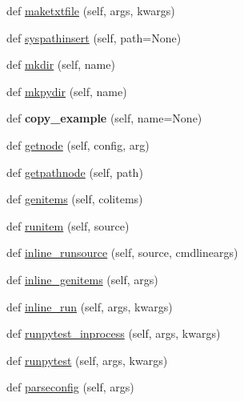\begin{DoxyCompactItemize}
\item 
def \hyperlink{class__pytest_1_1pytester_1_1_testdir_af243dc840be0d233114a96752547a33b}{maketxtfile} (self, args, kwargs)
\item 
def \hyperlink{class__pytest_1_1pytester_1_1_testdir_a9437e10415a1ca4b4fe29673915068bf}{syspathinsert} (self, path=None)
\item 
def \hyperlink{class__pytest_1_1pytester_1_1_testdir_a7d88a5789ed53d858fc1fe101a1be593}{mkdir} (self, name)
\item 
def \hyperlink{class__pytest_1_1pytester_1_1_testdir_ab2d4c79312104e21f88d2eb6230066b1}{mkpydir} (self, name)
\item 
\mbox{\label{class__pytest_1_1pytester_1_1_testdir_a9c9677a0d603a348e0b35bac29d9a255}} 
def {\bfseries copy\+\_\+example} (self, name=None)
\item 
def \hyperlink{class__pytest_1_1pytester_1_1_testdir_af9e60f840e1eeaa260f1fd64b636cbe7}{getnode} (self, config, arg)
\item 
def \hyperlink{class__pytest_1_1pytester_1_1_testdir_ac544eecddd1077f1de26cd535b1da6a9}{getpathnode} (self, path)
\item 
def \hyperlink{class__pytest_1_1pytester_1_1_testdir_af47df60840de34d96ad0b034011a68a8}{genitems} (self, colitems)
\item 
def \hyperlink{class__pytest_1_1pytester_1_1_testdir_a65252fa712e7952bb810a29fbbc6dc0f}{runitem} (self, source)
\item 
def \hyperlink{class__pytest_1_1pytester_1_1_testdir_a2ee5a96d0465218a7690d1b8de82b944}{inline\+\_\+runsource} (self, source, cmdlineargs)
\item 
def \hyperlink{class__pytest_1_1pytester_1_1_testdir_aafd63d830bf03e153edb68743b088bcb}{inline\+\_\+genitems} (self, args)
\item 
def \hyperlink{class__pytest_1_1pytester_1_1_testdir_a4711a4fc9f56c770f3363942196d0795}{inline\+\_\+run} (self, args, kwargs)
\item 
def \hyperlink{class__pytest_1_1pytester_1_1_testdir_a2cd927260d911e6989e75fa661b34bd8}{runpytest\+\_\+inprocess} (self, args, kwargs)
\item 
def \hyperlink{class__pytest_1_1pytester_1_1_testdir_add6344e4fc783225edc046028ad0b6a5}{runpytest} (self, args, kwargs)
\item 
def \hyperlink{class__pytest_1_1pytester_1_1_testdir_a6671443043de27616f6487d3a9d0b539}{parseconfig} (self, args)

\end{DoxyCompactItemize}
